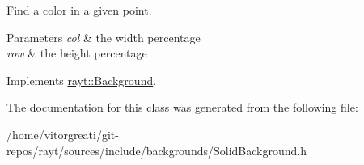 Find a color in a given point. 


\begin{DoxyParams}{Parameters}
{\em col} & the width percentage \\
\hline
{\em row} & the height percentage \\
\hline
\end{DoxyParams}


Implements \mbox{\hyperlink{classrayt_1_1_background_ada66e69d97dada79872cd7f79326b8cd}{rayt\+::\+Background}}.



The documentation for this class was generated from the following file\+:\begin{DoxyCompactItemize}
\item 
/home/vitorgreati/git-\/repos/rayt/sources/include/backgrounds/Solid\+Background.\+h\end{DoxyCompactItemize}

